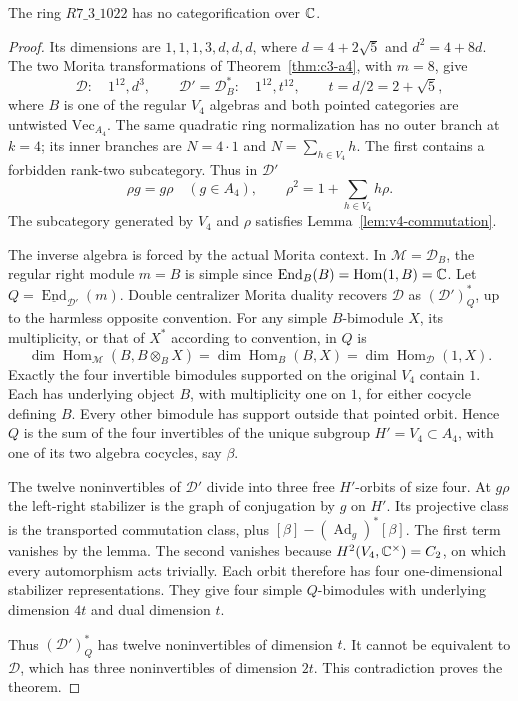 \begin{theorem}\label{thm:r1022-general}
The ring $R7\_3\_1022$ has no categorification over $\mathbb C$.
\end{theorem}
\begin{proof}
Its dimensions are $1,1,1,3,d,d,d$, where
$d=4+2\sqrt5$ and $d^2=4+8d$. The two Morita transformations of
Theorem~\ref{thm:c3-a4}, with $m=8$, give
\[
 \mathcal D:\quad 1^{12},d^3,
 \qquad
 \mathcal D'=\mathcal D_B^*:\quad 1^{12},t^{12},
 \qquad t=d/2=2+\sqrt5,
\]
where $B$ is one of the regular $V_4$ algebras and both pointed
categories are untwisted $\mathrm{Vec}_{A_4}$. The same quadratic
ring normalization has no outer branch at $k=4$; its inner branches
are $N=4\cdot1$ and $N=\sum_{h\in V_4}h$. The first contains a
forbidden rank-two subcategory. Thus in $\mathcal D'$
\[
 \rho g=g\rho\quad(g\in A_4),\qquad
 \rho^2=1+\sum_{h\in V_4}h\rho.
\]
The subcategory generated by $V_4$ and $\rho$ satisfies
Lemma~\ref{lem:v4-commutation}.

The inverse algebra is forced by the actual Morita context.
In $\mathcal M=\mathcal D_B$, the regular right module $m=B$ is
simple since $\operatorname{End}_B(B)=\operatorname{Hom}(1,B)=\mathbb C$.
Let $Q=\underline{\operatorname{End}}_{\mathcal D'}(m)$.
Double centralizer Morita duality recovers $\mathcal D$ as
$(\mathcal D')_Q^*$, up to the harmless opposite convention. For
any simple $B$-bimodule $X$, its multiplicity, or that of $X^*$
according to convention, in $Q$ is
\[
 \dim\operatorname{Hom}_{\mathcal M}(B,B\otimes_BX)
 =\dim\operatorname{Hom}_B(B,X)
 =\dim\operatorname{Hom}_{\mathcal D}(1,X).
\]
Exactly the four invertible bimodules supported on the original
$V_4$ contain $1$. Each has underlying object $B$, with multiplicity
one on $1$, for either cocycle defining $B$. Every other bimodule
has support outside that pointed orbit. Hence $Q$ is the sum of the
four invertibles of the unique subgroup $H'=V_4\subset A_4$,
with one of its two algebra cocycles, say $\beta$.

The twelve noninvertibles of $\mathcal D'$ divide into three free
$H'$-orbits of size four. At $g\rho$ the left-right stabilizer is
the graph of conjugation by $g$ on $H'$. Its projective class is
the transported commutation class, plus
$[\beta]-(\operatorname{Ad}_g)^*[\beta]$.
The first term vanishes by the lemma. The second vanishes because
$H^2(V_4,\mathbb C^\times)=C_2$, on which every automorphism acts trivially.
Each orbit therefore has four one-dimensional stabilizer
representations. They give four simple $Q$-bimodules with underlying
dimension $4t$ and dual dimension $t$.

Thus $(\mathcal D')_Q^*$ has twelve noninvertibles of dimension $t$.
It cannot be equivalent to $\mathcal D$, which has three
noninvertibles of dimension $2t$. This contradiction proves the theorem.
\end{proof}
